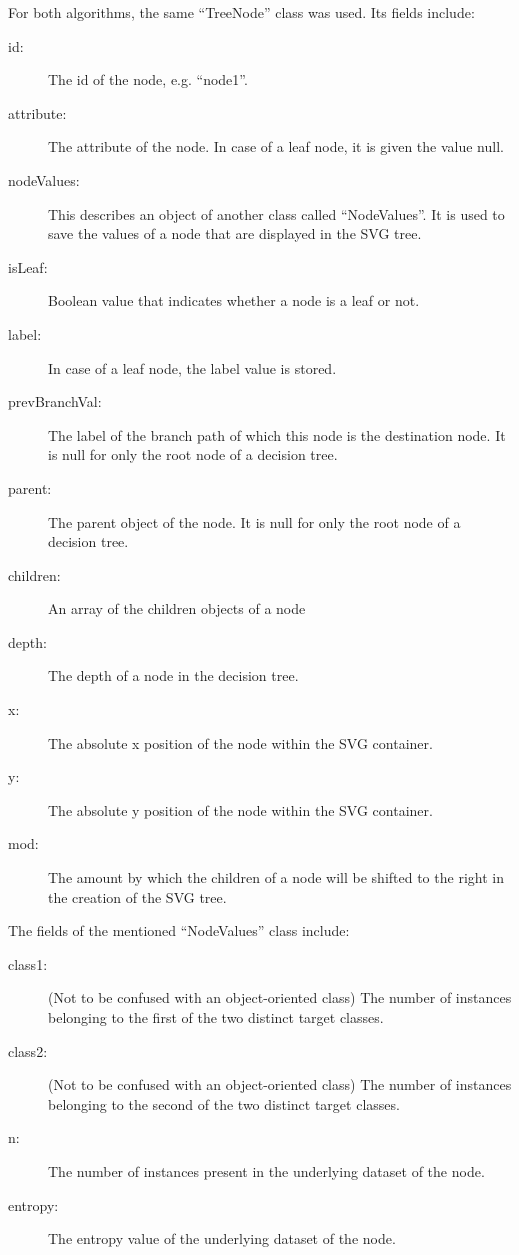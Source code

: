 For both algorithms, the same ``TreeNode'' class was used. Its fields include:
\begin{description}
    \item[id:] The id of the node, e.g. ``node1''.
    \item[attribute:] The attribute of the node. In case of a leaf node, it is given the value null.
    \item[nodeValues:] This describes an object of another class called ``NodeValues''. It is used to save the values of a node that are displayed in the SVG tree.
    \item[isLeaf:] Boolean value that indicates whether a node is a leaf or not.
    \item[label:] In case of a leaf node, the label value is stored.
    \item[prevBranchVal:] The label of the branch path of which this node is the destination node. It is null for only the root node of a decision tree.
    \item[parent:] The parent object of the node. It is null for only the root node of a decision tree.
    \item[children:] An array of the children objects of a node
    \item[depth:] The depth of a node in the decision tree.
    \item[x:] The absolute x position of the node within the SVG container.
    \item[y:] The absolute y position of the node within the SVG container.
    \item[mod:] The amount by which the children of a node will be shifted to the right in the creation of the SVG tree.
\end{description}

The fields of the mentioned ``NodeValues'' class include:
\begin{description}
    \item[class1:] (Not to be confused with an object-oriented class) The number of instances belonging to the first of the two distinct target classes.
    \item[class2:] (Not to be confused with an object-oriented class) The number of instances belonging to the second of the two distinct target classes.
    \item[n:] The number of instances present in the underlying dataset of the node.
    \item[entropy:] The entropy value of the underlying dataset of the node.
\end{description}

